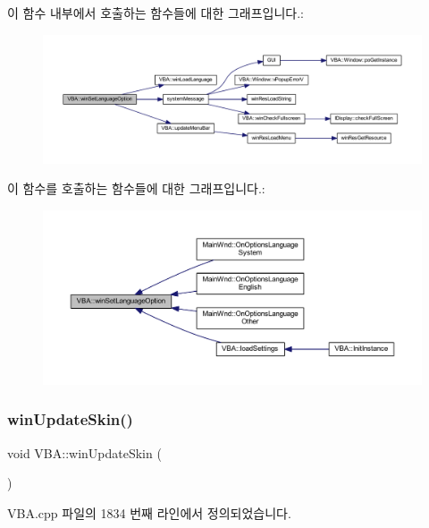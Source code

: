 이 함수 내부에서 호출하는 함수들에 대한 그래프입니다.\+:
\nopagebreak
\begin{figure}[H]
\begin{center}
\leavevmode
\includegraphics[width=350pt]{class_v_b_a_ae872998a3ecf3ec0d504378744f441e6_cgraph}
\end{center}
\end{figure}
이 함수를 호출하는 함수들에 대한 그래프입니다.\+:
\nopagebreak
\begin{figure}[H]
\begin{center}
\leavevmode
\includegraphics[width=350pt]{class_v_b_a_ae872998a3ecf3ec0d504378744f441e6_icgraph}
\end{center}
\end{figure}
\mbox{\label{class_v_b_a_a4648998e25679df69b15afdccb428b8f}} 
\subsubsection{\texorpdfstring{win\+Update\+Skin()}{winUpdateSkin()}}
{\footnotesize\ttfamily void V\+B\+A\+::win\+Update\+Skin (\begin{DoxyParamCaption}{ }\end{DoxyParamCaption})}



V\+B\+A.\+cpp 파일의 1834 번째 라인에서 정의되었습니다.


